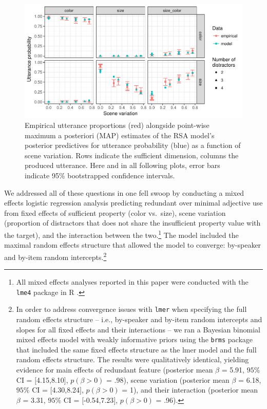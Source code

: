 \documentclass[11pt]{article}
\begin{document}
\begin{figure}
\centering
\includegraphics[width=.9\textwidth]{pics/exp1-empirical-predictives}
\caption{Empirical utterance proportions  (red)  alongside point-wise maximum a posteriori (MAP) estimates of the RSA model's posterior predictives for utterance probability (blue) as a function of scene variation. Rows indicate the sufficient dimension, columns the produced utterance. Here and in all following plots, error bars indicate 95\% bootstrapped confidence intervals.}
\label{fig:exp1results}
\end{figure}

We addressed all of these questions in one fell swoop by conducting a mixed effects logistic regression analysis predicting redundant over minimal adjective use from fixed effects of sufficient property (color vs.~size), scene variation (proportion of distractors that does not share the insufficient property value with the target), and the interaction between the two.\footnote{All mixed effects analyses reported in this paper were conducted with the \verb+lme4+ package \cite{lme4} in R \cite{R}.} The model included the maximal random effects structure that allowed the model to converge: by-speaker and by-item random intercepts.\footnote{In order to address convergence issues with \verb+lmer+ when specifying the full random effects structure -- i.e., by-speaker and by-item random intercepts and slopes for all fixed effects and their interactions -- we ran a Bayesian binomial mixed effects model with weakly informative priors using the \verb+brms+ package \cite{brms} that included the same fixed effects structure as the lmer model and the full random effects structure. The results were qualitatively identical, yielding  evidence for main effects of redundant feature (posterior mean $\beta$ = 5.91, $95\%$ CI = $[$4.15,8.10$]$, $p(\beta > 0)$ = .98), scene variation (posterior mean $\beta$ = 6.18, $95\%$ CI = $[$4.30,8.24$]$, $p(\beta > 0)$ = 1), and their interaction (posterior mean $\beta$ = 3.31, $95\%$ CI = $[$-0.54,7.23$]$, $p(\beta > 0)$ = .96).}
\end{document}
